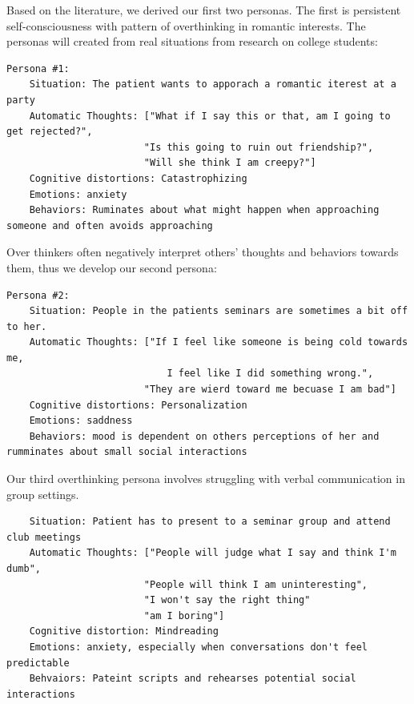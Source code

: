 \documentclass[twoside]{report}
\begin{document}
Based on the literature, we derived our first two personas. The first is persistent self-consciousness with pattern of overthinking in romantic interests. The personas will created from real situations from research on college students:
\begin{verbatim}
Persona #1:
    Situation: The patient wants to apporach a romantic iterest at a party
    Automatic Thoughts: ["What if I say this or that, am I going to get rejected?",
                        "Is this going to ruin out friendship?", 
                        "Will she think I am creepy?"]
    Cognitive distortions: Catastrophizing
    Emotions: anxiety
    Behaviors: Ruminates about what might happen when approaching someone and often avoids approaching
\end{verbatim}
Over thinkers often negatively interpret others' thoughts and behaviors towards them, thus we develop our second persona:
\begin{verbatim}
Persona #2:
    Situation: People in the patients seminars are sometimes a bit off to her. 
    Automatic Thoughts: ["If I feel like someone is being cold towards me, 
                            I feel like I did something wrong.",
                        "They are wierd toward me becuase I am bad"]
    Cognitive distortions: Personalization
    Emotions: saddness
    Behaviors: mood is dependent on others perceptions of her and rumminates about small social interactions
\end{verbatim}
Our third overthinking persona involves struggling with verbal communication in group settings.
\begin{verbatim}
    Situation: Patient has to present to a seminar group and attend club meetings
    Automatic Thoughts: ["People will judge what I say and think I'm dumb",
                        "People will think I am uninteresting", 
                        "I won't say the right thing"
                        "am I boring"]
    Cognitive distortion: Mindreading
    Emotions: anxiety, especially when conversations don't feel predictable
    Behvaiors: Pateint scripts and rehearses potential social interactions
\end{verbatim}
\end{document}
